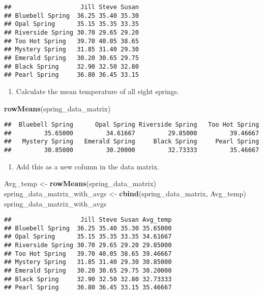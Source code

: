 \documentclass[
]{article}
\newenvironment{Shaded}{\begin{snugshade}}{\end{snugshade}}
\newcommand{\FunctionTok}[1]{\textcolor[rgb]{0.13,0.29,0.53}{\textbf{#1}}}
\newcommand{\NormalTok}[1]{#1}
\newcommand{\OtherTok}[1]{\textcolor[rgb]{0.56,0.35,0.01}{#1}}
\providecommand{\tightlist}{%
  \setlength{\itemsep}{0pt}\setlength{\parskip}{0pt}}
\begin{document}
\begin{verbatim}
##                   Jill Steve Susan
## Bluebell Spring  36.25 35.40 35.30
## Opal Spring      35.15 35.35 33.35
## Riverside Spring 30.70 29.65 29.20
## Too Hot Spring   39.70 40.05 38.65
## Mystery Spring   31.85 31.40 29.30
## Emerald Spring   30.20 30.65 29.75
## Black Spring     32.90 32.50 32.80
## Pearl Spring     36.80 36.45 33.15
\end{verbatim}

\begin{enumerate}
\def\labelenumi{\arabic{enumi}.}
\setcounter{enumi}{5}
\tightlist
\item
  Calculate the mean temperature of all eight springs.
\end{enumerate}

\begin{Shaded}
\begin{Highlighting}[]
\FunctionTok{rowMeans}\NormalTok{(spring\_data\_matrix)}
\end{Highlighting}
\end{Shaded}

\begin{verbatim}
##  Bluebell Spring      Opal Spring Riverside Spring   Too Hot Spring 
##         35.65000         34.61667         29.85000         39.46667 
##   Mystery Spring   Emerald Spring     Black Spring     Pearl Spring 
##         30.85000         30.20000         32.73333         35.46667
\end{verbatim}

\begin{enumerate}
\def\labelenumi{\arabic{enumi}.}
\setcounter{enumi}{6}
\tightlist
\item
  Add this as a new column in the data matrix.
\end{enumerate}

\begin{Shaded}
\begin{Highlighting}[]
\NormalTok{Avg\_temp  }\OtherTok{\textless{}{-}} \FunctionTok{rowMeans}\NormalTok{(spring\_data\_matrix)}
\NormalTok{spring\_data\_matrix\_with\_avgs }\OtherTok{\textless{}{-}} \FunctionTok{cbind}\NormalTok{(spring\_data\_matrix, Avg\_temp)}
\NormalTok{spring\_data\_matrix\_with\_avgs}
\end{Highlighting}
\end{Shaded}

\begin{verbatim}
##                   Jill Steve Susan Avg_temp
## Bluebell Spring  36.25 35.40 35.30 35.65000
## Opal Spring      35.15 35.35 33.35 34.61667
## Riverside Spring 30.70 29.65 29.20 29.85000
## Too Hot Spring   39.70 40.05 38.65 39.46667
## Mystery Spring   31.85 31.40 29.30 30.85000
## Emerald Spring   30.20 30.65 29.75 30.20000
## Black Spring     32.90 32.50 32.80 32.73333
## Pearl Spring     36.80 36.45 33.15 35.46667
\end{verbatim}
\end{document}
